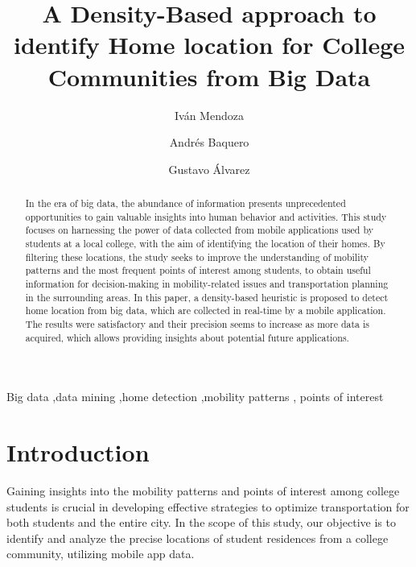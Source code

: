 \documentclass[]{elsarticle} %
\begin{document}
\begin{frontmatter}

  \title{A Density-Based approach to identify Home location for College
Communities from Big Data}
    \author[1]{Iván Mendoza%
  }
    \author[1]{Andrés Baquero%
  }
    \author[1]{Gustavo Álvarez%
  }
  
  \begin{abstract}
  In the era of big data, the abundance of information presents
  unprecedented opportunities to gain valuable insights into human
  behavior and activities. This study focuses on harnessing the power of
  data collected from mobile applications used by students at a local
  college, with the aim of identifying the location of their homes. By
  filtering these locations, the study seeks to improve the
  understanding of mobility patterns and the most frequent points of
  interest among students, to obtain useful information for
  decision-making in mobility-related issues and transportation planning
  in the surrounding areas. In this paper, a density-based heuristic is
  proposed to detect home location from big data, which are collected in
  real-time by a mobile application. The results were satisfactory and
  their precision seems to increase as more data is acquired, which
  allows providing insights about potential future applications.
  \end{abstract}
    \begin{keyword}
    Big data \sep data mining \sep home detection \sep mobility
patterns \sep 
    points of interest
  \end{keyword}
  
 \end{frontmatter}

\hypertarget{introduction}{%
\section{Introduction}\label{introduction}}

Gaining insights into the mobility patterns and points of interest among
college students is crucial in developing effective strategies to
optimize transportation for both students and the entire city. In the
scope of this study, our objective is to identify and analyze the
precise locations of student residences from a college community,
utilizing mobile app data.
\end{document}
